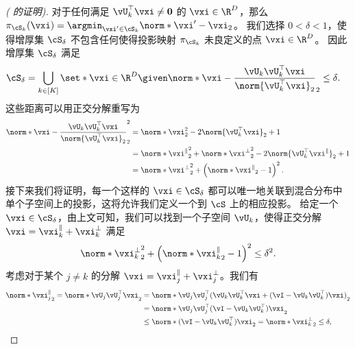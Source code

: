 \documentclass[../../book-main_zh.tex]{subfiles}
\begin{document}
\begin{proof}[( 的证明)]
    对于任何满足 $\vU_k^\top \vxi \neq \mathbf{0}$ 的 $\vxi \in \R^D$，那么 $\pi_{\cS_k}(\vxi) = \argmin_{\vxi' \in \cS_k}\norm*{\vxi' - \vxi}_2$。
    我们选择 $0 < \delta < 1$，使得增厚集 $\cS_{\delta}$ 不包含任何使得投影映射 $\pi_{\cS_k}$ 未良定义的点 $\vxi \in \R^D$。
    因此增厚集 $\cS_{\delta}$ 满足
    \begin{align}
        \cS_{\delta}
        &= \bigcup_{k \in [K]} \set*{\vxi \in \R^D \given
            \norm*{\vxi - \frac{\vU_k\vU_k^\top
            \vxi}{\norm{\vU_k^\top \vxi}_2}}_2
        \leq \delta}.
    \end{align}
    这些距离可以用正交分解重写为
    \begin{align}
        \norm*{\vxi - \frac{\vU_k\vU_k^\top \vxi}{\norm{\vU_k^\top \vxi}_2}}_2^2
        &=
        \norm*{\vxi}_2^2 - 2 \norm{\vU_k^\top \vxi}_2 + 1
        \\
        &=
        \norm*{\vxi^{\|}}_2^2
        + \norm*{\vxi^{\perp}}_2^2
        - 2 \norm{\vU_k^\top \vxi^{\|}}_2 + 1
        \\
        &=
        \norm*{\vxi^{\perp}}_2^2
        + \left( \norm*{\vxi^{\|}}_2 - 1 \right)^2.
        \label{eq:distance-to-hypersphere}
    \end{align}
    接下来我们将证明，每一个这样的 $\vxi \in \cS_{\delta}$ 都可以唯一地关联到混合分布中单个子空间上的投影，这将允许我们定义一个到 $\cS$ 上的相应投影。
    给定一个 $\vxi \in \cS_{\delta}$，由上文可知，我们可以找到一个子空间 $\vU_k$，使得正交分解 $\vxi = \vxi^{\|}_k + \vxi^{\perp}_k$ 满足
    \begin{equation}
        \norm*{\vxi^{\perp}_k}_2^2
        + \left( \norm*{\vxi^{\|}_k}_2 - 1 \right)^2
        \leq
        \delta^2.
    \end{equation}
    考虑对于某个 $j \neq k$ 的分解 $\vxi = \vxi_j^{\|} + \vxi_j^{\perp}$。我们有
    \begin{align}
        \norm*{\vxi_j^{\|}}_2
        =
        \norm*{
            \vU_j \vU_j^\top \vxi
        }_2
        &=
        \norm*{
            \vU_j \vU_j^\top( \vU_k \vU_k^\top \vxi + (\vI - \vU_k \vU_k^\top)
            \vxi )
        }_2
        \\
        &=
        \norm*{
            \vU_j \vU_j^\top (\vI - \vU_k \vU_k^\top) \vxi
        }_2
        \\
        &\leq
        \norm*{
            (\vI - \vU_k \vU_k^\top) \vxi
        }_2
        =
        \norm*{
            \vxi_k^{\perp}
        }_2
        \leq \delta,
    \end{align}

\end{proof}
\end{document}
